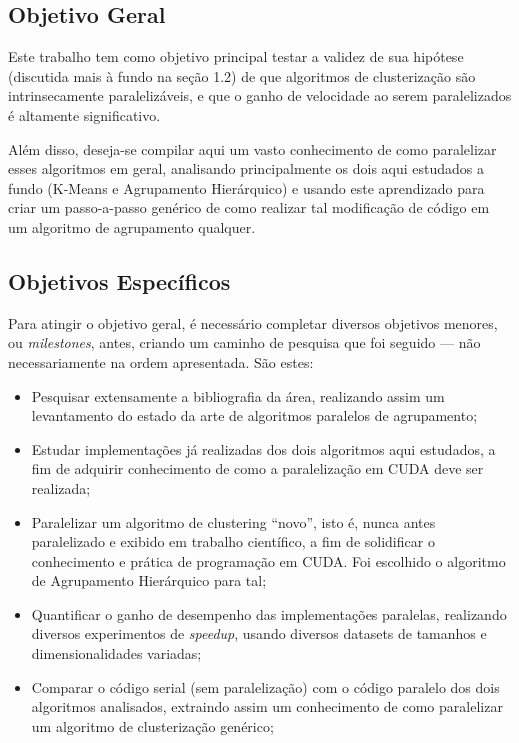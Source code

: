 \documentclass[12pt,
openright, 
oneside, %
a4paper,    %
brazil]{facom-ufu-abntex2}
\def\qntAlgrtm{dois}
\begin{document}

\subsection{Objetivo Geral}

Este trabalho tem como objetivo principal testar a validez de sua hipótese (discutida mais à fundo na seção 1.2) de que algoritmos de clusterização são intrinsecamente paralelizáveis, e que o ganho de velocidade ao serem paralelizados é altamente significativo.

Além disso, deseja-se compilar aqui um vasto conhecimento de como paralelizar esses algoritmos em geral, analisando principalmente os \qntAlgrtm{} aqui estudados a fundo (K-Means e Agrupamento Hierárquico) e usando este aprendizado para criar um passo-a-passo genérico de como realizar tal modificação de código em um algoritmo de agrupamento qualquer.




\subsection{Objetivos Específicos}

Para atingir o objetivo geral, é necessário completar diversos objetivos menores, ou \textit{milestones}, antes, criando um caminho de pesquisa que foi seguido --- não necessariamente na ordem apresentada. São estes:

\begin{itemize}
  \item Pesquisar extensamente a bibliografia da área, realizando assim um levantamento do estado da arte de algoritmos paralelos de agrupamento;
  
  \item Estudar implementações já realizadas dos \qntAlgrtm{} algoritmos aqui estudados, a fim de adquirir conhecimento de como a paralelização em CUDA deve ser realizada;
  
  \item Paralelizar um algoritmo de clustering \enquote{novo}, isto é, nunca antes paralelizado e exibido em trabalho científico, a fim de solidificar o conhecimento e prática de programação em CUDA. Foi escolhido o algoritmo de Agrupamento Hierárquico para tal;
  
  \item Quantificar o ganho de desempenho das implementações paralelas, realizando diversos experimentos de \textit{speedup}, usando diversos datasets de tamanhos e dimensionalidades variadas;
  
  \item Comparar o código serial (sem paralelização) com o código paralelo dos \qntAlgrtm{} algoritmos analisados, extraindo assim um conhecimento de como paralelizar um algoritmo de clusterização genérico;
\end{itemize}
\end{document}
